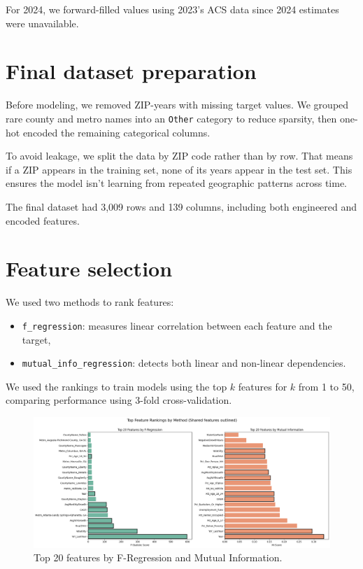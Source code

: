 For 2024, we forward-filled values using 2023’s ACS data since 2024 estimates were unavailable.

\section{Final dataset preparation}
Before modeling, we removed ZIP-years with missing target values. We grouped rare county and metro names into an \texttt{Other} category to reduce sparsity, then one-hot encoded the remaining categorical columns.

To avoid leakage, we split the data by ZIP code rather than by row. That means if a ZIP appears in the training set, none of its years appear in the test set. This ensures the model isn’t learning from repeated geographic patterns across time.

The final dataset had 3{,}009 rows and 139 columns, including both engineered and encoded features.

\section{Feature selection}
We used two methods to rank features:
\begin{itemize}
    \item \texttt{f\_regression}: measures linear correlation between each feature and the target,
    \item \texttt{mutual\_info\_regression}: detects both linear and non-linear dependencies.
\end{itemize}

We used the rankings to train models using the top $k$ features for $k$ from 1 to 50, comparing performance using 3-fold cross-validation.

\begin{figure}[!ht]
    \centering
    \includegraphics[width=\textwidth]{figures/topfeatures.png}
    \caption{Top 20 features by F-Regression and Mutual Information.}
    \label{fig:top_features}
\end{figure}
\FloatBarrier

